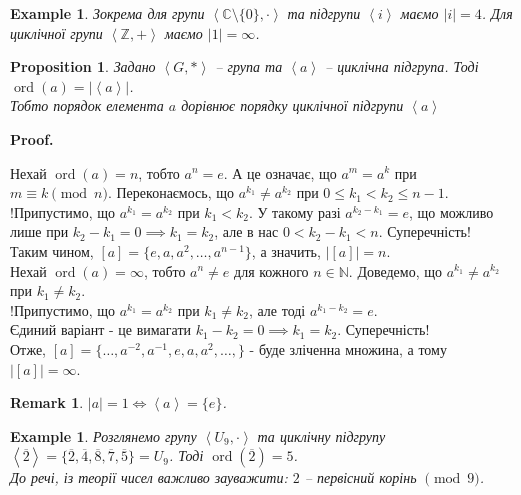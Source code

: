 \documentclass[a4paper, 10pt]{article}
\makeatletter
\theoremstyle{theoremdd}
\theoremstyle{theoremdd}
\theoremstyle{theoremdd}
\theoremstyle{theoremdd}
\theoremstyle{theoremdd}
\newtheorem{example}[theorem]{Example}
\theoremstyle{theoremdd}
\theoremstyle{theoremdd}
\theoremstyle{theoremdd}
\theoremstyle{theoremdd}
\newtheorem{proposition}[theorem]{Proposition}
\theoremstyle{theoremdd}
\theoremstyle{theoremdd}
\newtheorem{remark}[theorem]{Remark}
\theoremstyle{theoremdd}
\theoremstyle{theoremdd}
\theoremstyle{theoremdd}
\theoremstyle{theoremdd}
\renewenvironment{proof}[1][Proof.\\]{\par
\pushQED{\hfill \qed}%
\normalfont \topsep6\p@\@plus6\p@\relax
\trivlist
\item\relax
{\bfseries
#1\@addpunct{.}}\hspace\labelsep\ignorespaces
}{%
\popQED\endtrivlist\@endpefalse
}
\DeclareMathOperator{\ord}{ord}
\makeatother
\begin{document}
\begin{example}
Зокрема для групи $\left< \mathbb{C} \setminus \{0\}, \cdot \right>$ та підгрупи $\left< i \right>$ маємо $|i| = 4$. Для циклічної групи $\left< \mathbb{Z},+\right>$ маємо $|1| = \infty$.
\end{example}

\begin{proposition}
Задано $\left<G,* \right>$ -- група та $\left<a\right>$ -- циклічна підгрупа. Тоді $\ord (a) = |\left<a\right>|$.\\
Тобто порядок елемента $a$ дорівнює порядку циклічної підгрупи $\left<a\right>$
\end{proposition}

\begin{proof}
Нехай $\ord (a) = n$, тобто $a^n = e$. А це означає, що $a^m = a^k$ при $m \equiv k \pmod n$. Переконаємось, що $a^{k_1} \neq a^{k_2}$ при $0 \leq k_1 < k_2 \leq n-1$.\\
!Припустимо, що $a^{k_1} = a^{k_2}$ при $k_1 < k_2$. У такому разі $a^{k_2-k_1} = e$, що можливо лише при $k_2-k_1 = 0 \implies k_1 = k_2$, але в нас $0 < k_2-k_1 < n$. Суперечність!\\
Таким чином, $[a] = \{e,a,a^2,\dots,a^{n-1}\}$, а значить, $|[a]| = n$.
\bigskip \\
Нехай $\ord (a) = \infty$, тобто $a^n \neq e$ для кожного $n \in \mathbb{N}$. Доведемо, що $a^{k_1} \neq a^{k_2}$ при $k_1 \neq k_2$.\\
!Припустимо, що $a^{k_1} = a^{k_2}$ при $k_1 \neq k_2$, але тоді $a^{k_1-k_2} = e$.\\
Єдиний варіант - це вимагати $k_1-k_2 = 0 \implies k_1 = k_2$. Суперечність!\\
Отже, $[a] = \{ \dots,a^{-2},a^{-1},e,a,a^2,\dots,\}$ - буде зліченна множина, а тому $|[a]| = \infty$.
\end{proof}

\begin{remark}
$|a| = 1 \iff \left<a\right> = \{e\}$.
\iffalse
Дійсно, якщо $|a| = 1$, то тоді $a^1 = e$, а тому звідси $a^2=a^3=\dots = e$. Також звідси $a^{-1} = a^{-2} = \dots = e$. Отже, $[a] = \{e\}$.\\
А якщо $[a] = \{e\}$, то зрозуміло, що $|a| = 1$.
\fi
\end{remark}

\begin{example}
Розглянемо групу $\left< U_9, \cdot \right>$ та циклічну підгрупу $\left<\overline{2}\right> = \{ \overline{2}, \overline{4}, \overline{8}, \overline{7}, \overline{5} \} = U_9$. Тоді $\ord (\overline{2}) = 5$.\\
До речі, із теорії чисел важливо зауважити: $2$ -- первісний корінь $\pmod 9$.
\end{example}
\end{document}
